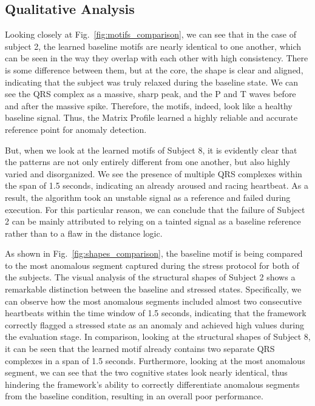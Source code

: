 \documentclass[conference,10pt]{IEEEtran}
\begin{document}
\subsection{Qualitative Analysis}

Looking closely at Fig.~\ref{fig:motifs_comparison}, we can see that in the case of subject 2, the learned baseline motifs are nearly identical to one another, which can be seen in the way they overlap with each other with high consistency. There is some difference between them, but at the core, the shape is clear and aligned, indicating that the subject was truly relaxed during the baseline state. We can see the QRS complex as a massive, sharp peak, and the P and T waves before and after the massive spike. Therefore, the motifs, indeed, look like a healthy baseline signal. Thus, the Matrix Profile learned a highly reliable and accurate reference point for anomaly detection.

But, when we look at the learned motifs of Subject 8, it is evidently clear that the patterns are not only entirely different from one another, but also highly varied and disorganized. We see the presence of multiple QRS complexes within the span of 1.5 seconds, indicating an already aroused and racing heartbeat. As a result, the algorithm took an unstable signal as a reference and failed during execution. For this particular reason, we can conclude that the failure of Subject 2 can be mainly attributed to relying on a tainted signal as a baseline reference rather than to a flaw in the distance logic.

As shown in Fig.~\ref{fig:shapes_comparison}, the baseline motif is being compared to the most anomalous segment captured during the stress protocol for both of the subjects.
The visual analysis of the structural shapes of Subject 2 shows a remarkable distinction between the baseline and stressed states. Specifically, we can observe how the most anomalous segments included almost two consecutive heartbeats within the time window of 1.5 seconds, indicating that the framework correctly flagged a stressed state as an anomaly and achieved high values during the evaluation stage. 
In comparison, looking at the structural shapes of Subject 8, it can be seen that the learned motif already contains two separate QRS complexes in a span of 1.5 seconds. Furthermore, looking at the most anomalous segment, we can see that the two cognitive states look nearly identical, thus hindering the framework’s ability to correctly differentiate anomalous segments from the baseline condition, resulting in an overall poor performance.
\end{document}
